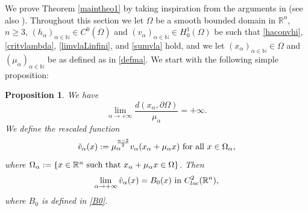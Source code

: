 \documentclass[10pt]{amsart}
\numberwithin{equation}{section}
\newcommand{\Om}{\Omega}
\newcommand{\ma}{\mu_\alpha}
\def \rr {\mathbb{R}}
\def \bb{\hbox}
\def \xl{x_\alpha}
\def \ls{+\infty}
\def\la{\alpha}
\def \ma{\mu_{\alpha}}
\def \tva{\tilde{v}_{\alpha}}
\def \va{v_{\alpha}}
\def \ha{h_{\alpha}}
\def \nn{\mathbb{N}}
\theoremstyle{plain}
\newtheorem{prop}{Proposition}[section]%
\theoremstyle{remark}
\begin{document}
 \medskip
 
We prove Theorem \ref{maintheo1} by taking inspiration from the arguments in \cite{DHpde} (see also \cite{HebeyZLAM}). Throughout this section we let $\Om$ be a smooth bounded domain in $\rr^n$, $n\geq 3$, $(\ha)_{\alpha \in \nn} \in C^{0}(\overline{\Om})$ and  $(\va)_{\alpha \in \nn}\in H_0^1(\Om)$  be such that \eqref{haconvhi}, \eqref{critvlambda}, \eqref{limvlaLinfini},   and \eqref{sumvla} hold, and we let $(\xl)_{\alpha \in \nn} \in\Om$ and $(\ma)_{\alpha \in \nn}$  be as defined as in \eqref{defma}. We start with the following simple proposition:
	\begin{prop}\label{prop:Blowup1}
We have 
\begin{equation}\label{dasurma}
	\lim_{\la\to \ls} \frac{d(\xl,\partial\Om)}{\ma}= +\infty.
\end{equation} 
 We define the rescaled function 
	\begin{equation}\label{deftva}
		\tva(x):=\ma^{\frac{n-2}{2}}\va(\xl+\ma x) \bb{ for all } x\in \Om_{\la},
	\end{equation}
where $\Om_{\la}:= \{x\in \rr^n \bb{ such that } \xl+\ma x\in \Om\}$. Then
 \begin{equation}\label{limtvaB0}
 	\lim_{\la\to\ls} \tva(x)=B_0(x) \bb{ in }C^2_{loc}(\rr^n),
 \end{equation}
 where $B_0$ is defined in \eqref{B0}.
 \end{prop}
\end{document}
